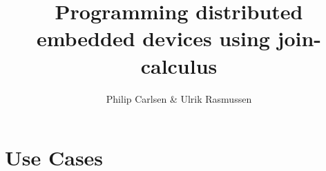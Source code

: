 \documentclass[a4paper, oneside, draft]{memoir}
\title{Programming distributed embedded devices using join-calculus}
\author{Philip Carlsen \& Ulrik Rasmussen}
\begin{document}
\frontmatter

\maketitle
\iffalse
\begin{abstract}

\end{abstract}

\clearpage
\chapter*{Preface}


\clearpage

\tableofcontents*

\fi
\mainmatter
\iffalse
\chapter{Introduction}

\fi
\chapter{Use Cases}




\end{document}
